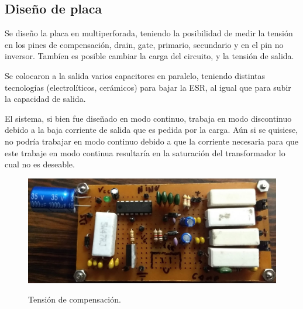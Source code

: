 %
%
%

\subsection{Diseño de placa}
Se diseño la placa en multiperforada, teniendo la posibilidad de medir la tensión en los pines de compensación, drain, gate, primario, secundario y en el pin no inversor. Tambíen es posible cambiar la carga del circuito, y la tensión de salida.

Se colocaron a la salida varios capacitores en paralelo, teniendo distintas tecnologías (electrolíticos, cerámicos) para bajar la ESR, al igual que para subir la capacidad de salida. 

El sistema, si bien fue diseñado en modo continuo, trabaja en modo discontinuo debido a la baja corriente de salida que es pedida por la carga. Aún si se quisiese, no podría trabajar en modo continuo debido a que la corriente necesaria para que este trabaje en modo continua resultaría en la saturación del transformador lo cual no es deseable.

\begin{figure}[H]
	\centering
	\includegraphics[width=0.7\linewidth]{ImagenesParteIV/placa_facha.png}
	\label{fig:placa}
	\caption{Tensión de compensación.}
\end{figure}


